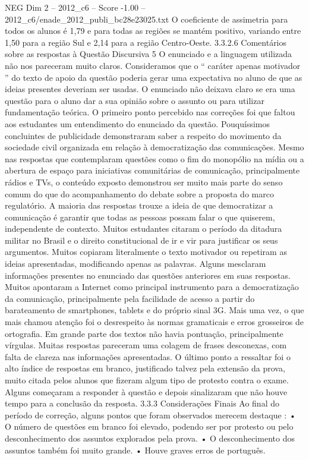 \begin{textsample}{NEG Dim 2 – 2012\_c6 – Score -1.00 – 2012\_c6/enade\_2012\_publi\_bc28e23025.txt}
O coeficiente de assimetria para todos os alunos é 1,79 e para todas as regiões se mantém positivo, variando entre 1,50 para a região Sul e 2,14 para a região Centro-Oeste. 3.3.2.6 Comentários sobre as respostas à Questão Discursiva 5 O enunciado e a linguagem utilizada não nos pareceram muito claros.
Consideramos que o “ caráter apenas motivador ” do texto de apoio da questão poderia gerar uma expectativa no aluno de que as ideias presentes deveriam ser usadas.
O enunciado não deixava claro se era uma questão para o aluno dar a sua opinião sobre o assunto ou para utilizar fundamentação teórica.
O primeiro ponto percebido nas correções foi que faltou aos estudantes um entendimento do enunciado da questão.
Pouquíssimos concluintes de publicidade demonstraram saber a respeito do movimento da sociedade civil organizada em relação à democratização das comunicações.
Mesmo nas respostas que contemplaram questões como o fim do monopólio na mídia ou a abertura de espaço para iniciativas comunitárias de comunicação, principalmente rádios e TVs, o conteúdo exposto demonstrou ser muito mais parte do senso comum do que do acompanhamento do debate sobre a proposta do marco regulatório.
A maioria das respostas trouxe a ideia de que democratizar a comunicação é garantir que todas as pessoas possam falar o que quiserem, independente de contexto.
Muitos estudantes citaram o período da ditadura militar no Brasil e o direito constitucional de ir e vir para justificar os seus argumentos.
Muitos copiaram literalmente o texto motivador ou repetiram as ideias apresentadas, modificando apenas as palavras.
Alguns mesclaram informações presentes no enunciado das questões anteriores em suas respostas.
Muitos apontaram a Internet como principal instrumento para a democratização da comunicação, principalmente pela facilidade de acesso a partir do barateamento de smartphones, tablets e do próprio sinal 3G.
Mais uma vez, o que mais chamou atenção foi o desrespeito às normas gramaticais e erros grosseiros de ortografia.
Em grande parte dos textos não havia pontuação, principalmente vírgulas.
Muitas respostas pareceram uma colagem de frases desconexas, com falta de clareza nas informações apresentadas.
O último ponto a ressaltar foi o alto índice de respostas em branco, justificado talvez pela extensão da prova, muito citada pelos alunos que fizeram algum tipo de protesto contra o exame.
Alguns começaram a responder à questão e depois sinalizaram que não houve tempo para a conclusão da resposta. 3.3.3 Considerações Finais Ao final do período de correção, alguns pontos que foram observados merecem destaque : • O número de questões em branco foi elevado, podendo ser por protesto ou pelo desconhecimento dos assuntos explorados pela prova. • O desconhecimento dos assuntos também foi muito grande. • Houve graves erros de português.

\end{textsample}
